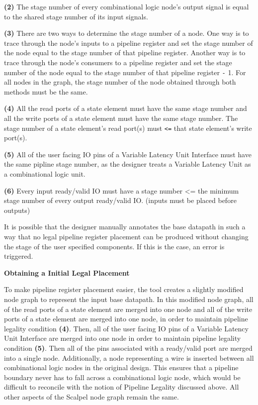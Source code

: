 {\bf (2)} The stage number of every combinational logic node's output signal is equal to the shared stage number of its input signals.

{\bf (3)} There are two ways to determine the stage number of a node. One way is to trace through the node's inputs to a pipeline register and set the stage number of the node equal to the stage number of that pipeline register. Another way is to trace through the node’s consumers to a pipeline register and set the stage number of the node equal to the stage number of that pipeline register {\tt -}  1. For all nodes in the graph, the stage number of the node obtained through both methods must be the same.

{\bf (4)} All the read ports of a state element must have the same stage number and all the write ports of a state element must have the same stage number. The stage number of a state element's read port(s) must {\tt <=} that state element's write port(s).

{\bf (5)} All of the user facing IO pins of a Variable Latency Unit Interface must have the same pipline stage number, as the designer treats a Variable Latency Unit as a combinational logic unit.

{\bf (6)} Every input ready/valid IO must have a stage number <= the minimum stage number of every output ready/valid IO. (inputs must be placed before outputs)

It is possible that the designer manually annotates the base datapath in such a way that no legal pipeline register placement can be produced without changing the stage of the user specified components. If this is the case, an error is triggered.


{\bf Obtaining a Initial Legal Placement}

To make pipeline register placement easier, the tool creates a slightly modified node graph to represent the input base datapath. In this modified node graph, all of the read ports of a state element are merged into one node and all of the write ports of a state element are merged into one node, in order to maintain pipeline legality condition {\bf (4)}. Then, all of the user facing IO pins of a Variable Latency Unit Interface are merged into one node in order to maintain pipeline legality condition {\bf (5)}. Then all of the pins associated with a ready/valid port are merged into a single node. Additionally, a node representing a wire is inserted between all combinational logic nodes in the original design. This ensures that a pipeline boundary never has to fall across a combinational logic node, which would be difficult to reconcile with the notion of Pipeline Legality discussed above. All other aspects of the Scalpel node graph remain the same.

